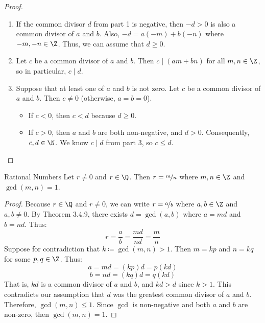 \documentclass[letterpaper,12pt]{report}
\begin{document}
\begin{proof}
\begin{enumerate}
		\item If the common divisor $d$ from part 1 is negative, then $-d > 0$ is also a common divisor of $a$ and $b$. Also, $-d = a(-m) + b(-n)$ where $-m, -n \in \Z$. Thus, we can assume that $d \geq 0$.

		\item Let $c$ be a common divisor of $a$ and $b$. Then $c \mid (am+bn)$ for all $m,n \in \Z$, so in particular, $c \mid d$.

		\item Suppose that at least one of $a$ and $b$ is not zero. Let $c$ be a common divisor of $a$ and $b$. Then $c \neq 0$ (otherwise, $a=b=0$).
		\begin{itemize}
			\item If $c < 0$, then $c<d$ because $d \geq 0$.
			\item If $c > 0$, then $a$ and $b$ are both non-negative, and $d > 0$. Consequently, $c,d \in \N$. We know $c \mid d$ from part 3, so $c \leq d$.
		\end{itemize}
	\end{enumerate}
\end{proof}

\begin{exbox}{Rational Numbers}{}
    Let $r \neq 0$ and $r \in \Q$. Then $r = \nicefrac{m}{n}$ where $m,n \in \Z$ and $\gcd(m,n) = 1$.
    \tcblower
    \begin{proof}
        Because $r \in \Q$ and $r \neq 0$, we can write $r = \nicefrac{a}{b}$ where $a,b \in \Z$ and $a,b \neq 0$. By Theorem 3.4.9, there exists $d = \gcd(a,b)$ where $a = md$ and $b = nd$. Thus:
        $$r = \frac{a}{b} = \frac{md}{nd} = \frac{m}{n}$$
        Suppose for contradiction that $k \coloneq \gcd(m,n) > 1$. Then $m = kp$ and $n = kq$ for some $p,q \in \Z$. Thus:
        $$a = md = (kp)d = p(kd)$$
        $$b = nd = (kq)d = q(kd)$$
        That is, $kd$ is a common divisor of $a$ and $b$, and $kd > d$ since $k > 1$. This contradicts our assumption that $d$ was the greatest common divisor of $a$ and $b$. Therefore, $\gcd(m,n) \leq 1$. Since $\gcd$ is non-negative and both $a$ and $b$ are non-zero, then $\gcd(m,n) = 1$.
    \end{proof}
\end{exbox}
\end{document}
